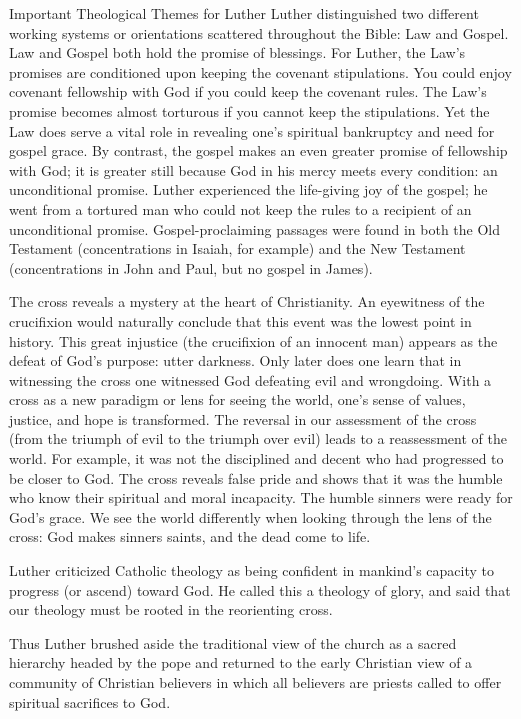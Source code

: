 \begin{sidebar}{Important Theological Themes for Luther}
Luther distinguished two different working systems or orientations scattered throughout the Bible:
Law and Gospel. Law and Gospel both hold the promise of blessings. For Luther, the Law’s promises
are conditioned upon keeping the covenant stipulations. You could enjoy covenant fellowship with God
if you could keep the covenant rules. The Law’s promise becomes almost torturous if you cannot keep
the stipulations. Yet the Law does serve a vital role in revealing one’s spiritual bankruptcy and
need for gospel grace. By contrast, the gospel makes an even greater promise of fellowship with God;
it is greater still because God in his mercy meets every condition: an unconditional promise. Luther
experienced the life-giving joy of the gospel; he went from a tortured man who could not keep the
rules to a recipient of an unconditional promise. Gospel-proclaiming passages were found in both the
Old Testament (concentrations in Isaiah, for example) and the New Testament (concentrations in John
and Paul, but no gospel in James).


The cross reveals a mystery at the heart of Christianity. An eyewitness of the crucifixion would
naturally conclude that this event was the lowest point in history. This great injustice (the
crucifixion of an innocent man) appears as the defeat of God’s purpose: utter darkness. Only later
does one learn that in witnessing the cross one witnessed God defeating evil and wrongdoing. With a
cross as a new paradigm or lens for seeing the world, one’s sense of values, justice, and hope is
transformed. The reversal in our assessment of the cross (from the triumph of evil to the triumph
over evil) leads to a reassessment of the world. For example, it was not the disciplined and decent
who had progressed to be closer to God. The cross reveals false pride and shows that it was the
humble who know their spiritual and moral incapacity. The humble sinners were ready for God’s grace.
We see the world differently when looking through the lens of the cross: God makes sinners saints,
and the dead come to life.

Luther criticized Catholic theology as being confident in mankind’s capacity to progress (or ascend)
toward God. He called this a theology of glory, and said that our theology must be rooted in the
reorienting cross.
\end{sidebar}

Thus Luther brushed aside the traditional view of the church as a sacred hierarchy headed by the
pope and returned to the early Christian view of a community of Christian believers in which all
believers are priests called to offer spiritual sacrifices to God.

